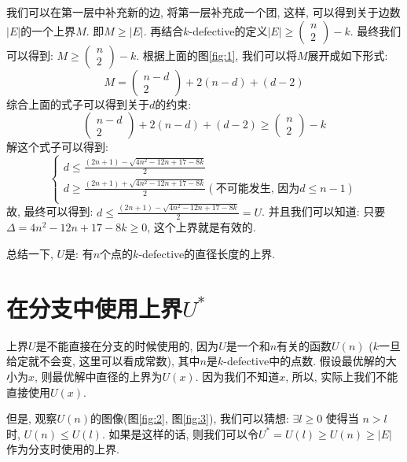 \documentclass{article}
\begin{document}
我们可以在第一层中补充新的边, 将第一层补充成一个团, 这样, 可以得到关于边数$|E|$的一个上界$M$.
即$M \geq |E|$. 再结合$k$-defective的定义$|E| \geq \left(\begin{array}{c} n \\ 2 \end{array}\right) - k$.
最终我们可以得到: $M \geq \left(\begin{array}{c} n \\ 2 \end{array}\right) - k$.
根据上面的图\ref{fig:1}, 我们可以将$M$展开成如下形式:
\[
	M = 
	\left( \begin{array}{c}
		n -d \\ 2
	\end{array} \right)
   	+ 2(n-d) + (d-2)
\]
综合上面的式子可以得到关于$d$的约束:
\[
	\left( \begin{array}{c}
		n -d \\ 2
	\end{array} \right)
   	+ 2(n-d) + (d-2)
	\geq
	\left(\begin{array}{c} n \\ 2 \end{array}\right) - k
\]
解这个式子可以得到:
\[
	\left\{
		\begin{array}{l}
			d \leq \frac{(2n+1) - \sqrt{4n^2 - 12n + 17 - 8k}}{2} \\
			d \geq \frac{(2n+1) + \sqrt{4n^2 - 12n + 17 - 8k}}{2} (\mbox{不可能发生, 因为$d \leq n-1$}) \\
		\end{array}
	\right.
\]
故, 最终可以得到: $d \leq \frac{(2n+1) - \sqrt{4n^2 - 12n + 17 - 8k}}{2} = U$.
并且我们可以知道: 只要$\Delta = 4n^2 - 12n + 17 - 8k \geq 0$, 这个上界就是有效的.

总结一下, $U$是: 有$n$个点的$k$-defective的直径长度的上界.

\section{在分支中使用上界$U^*$}
上界$U$是不能直接在分支的时候使用的, 因为$U$是一个和$n$有关的函数$U(n)$
($k$一旦给定就不会变, 这里可以看成常数), 其中$n$是$k$-defective中的点数.
假设最优解的大小为$x$, 则最优解中直径的上界为$U(x)$. 因为我们不知道$x$, 
所以, 实际上我们不能直接使用$U(x)$.

但是, 观察$U(n)$的图像(图\ref{fig:2}, 图\ref{fig:3}), 
我们可以猜想:
$\exists l \geq 0$ 使得当 $n > l$ 时, $U(n) \leq U(l)$.
如果是这样的话, 则我们可以令$U^* = U(l) \geq U(n) \geq |E|$作为分支时使用的上界.
\end{document}
